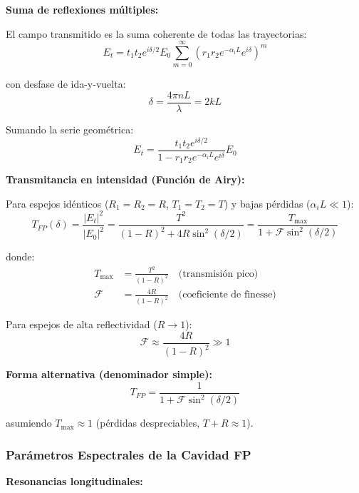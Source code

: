\documentclass[11pt,a4paper]{article}
\begin{document}
\textbf{Suma de reflexiones múltiples:}

El campo transmitido es la suma coherente de todas las trayectorias:
\begin{equation}
    E_t = t_1t_2e^{i\delta/2}E_0\sum_{m=0}^{\infty}(r_1r_2e^{-\alpha_iL}e^{i\delta})^m
\end{equation}

con desfase de ida-y-vuelta:
\begin{equation}
    \delta = \frac{4\pi nL}{\lambda} = 2kL
\end{equation}

Sumando la serie geométrica:
\begin{equation}
    E_t = \frac{t_1t_2e^{i\delta/2}}{1 - r_1r_2e^{-\alpha_iL}e^{i\delta}}E_0
\end{equation}

\textbf{Transmitancia en intensidad (Función de Airy):}

Para espejos idénticos ($R_1 = R_2 = R$, $T_1 = T_2 = T$) y bajas pérdidas ($\alpha_iL \ll 1$):
\begin{equation}
    T_{FP}(\delta) = \frac{|E_t|^2}{|E_0|^2} = \frac{T^2}{(1-R)^2 + 4R\sin^2(\delta/2)} = \frac{T_{\text{max}}}{1 + \mathcal{F}\sin^2(\delta/2)}
\end{equation}

donde:
\begin{align}
    T_{\text{max}} &= \frac{T^2}{(1-R)^2} \quad \text{(transmisión pico)}\\
    \mathcal{F} &= \frac{4R}{(1-R)^2} \quad \text{(coeficiente de finesse)}
\end{align}

Para espejos de alta reflectividad ($R \to 1$):
\begin{equation}
    \mathcal{F} \approx \frac{4R}{(1-R)^2} \gg 1
\end{equation}

\textbf{Forma alternativa (denominador simple):}
\begin{equation}
    T_{FP} = \frac{1}{1 + \mathcal{F}\sin^2(\delta/2)}
\end{equation}

asumiendo $T_{\text{max}} \approx 1$ (pérdidas despreciables, $T + R \approx 1$).

\subsubsection{Parámetros Espectrales de la Cavidad FP}

\textbf{Resonancias longitudinales:}
\end{document}
